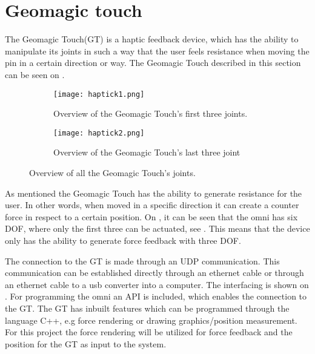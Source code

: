 \section{Geomagic touch}\label{sec:geo_magic}
The Geomagic Touch(GT) is a haptic feedback device, which has the ability to manipulate its joints in such a way that the user feels resistance when moving the pin in a certain direction or way. The Geomagic Touch described in this section can be seen on .

\begin{figure}[H]
	\centering
	\begin{subfigure}{.45\textwidth}
		\centering
		\texttt{[image: haptick1.png]}
		\caption{Overview of the Geomagic Touch's first three joints.}
		\label{fig:phantom1}
	\end{subfigure}
	\begin{subfigure}{.45\textwidth}
		\centering
		\texttt{[image: haptick2.png]}
		\caption{Overview of the Geomagic Touch's last three joint}
		\label{fig:phantom2}
	\end{subfigure}
\caption{Overview of all the Geomagic Touch's joints.}
\label{fig:phantom_omni}
\end{figure}

As mentioned the Geomagic Touch has the ability to generate resistance for the user. In other words, when moved in a specific direction it can create a counter force in respect to a certain position. On , it can be seen that the omni has six \gls{DOF}, where only the first three can be actuated, see . This means that the device only has the ability to generate force feedback with three \gls{DOF}.%

The connection to the GT is made through an UDP communication. This communication can be established directly through an ethernet cable or through an ethernet cable to a usb converter into a computer. The interfacing is shown on . For programming the omni an API is included, which enables the connection to the GT. The GT has inbuilt features which can be programmed through the language C++, e.g force rendering or drawing graphics/position measurement. For this project the force rendering will be utilized for force feedback and the position for the GT as input to the system. 
